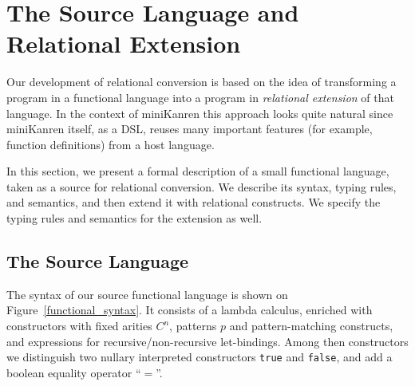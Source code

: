 \section{The Source Language and Relational Extension}

Our development of relational conversion is based on the idea of transforming a program in a functional
language into a program in \emph{relational extension} of that language. In the context of 
miniKanren this approach looks quite natural since miniKanren itself, as a DSL, reuses 
many important features (for example, function definitions) from a host language.

In this section, we present a formal description of a small functional language, taken as a source
for relational conversion. We describe its syntax, typing rules, and semantics, and then extend it
with relational constructs. We specify the typing rules and semantics for the extension as well.


\subsection{The Source Language}
\label{source_language}

The syntax of our source functional language is shown on Figure~\ref{functional_syntax}. It consists of a lambda calculus, 
enriched with constructors with fixed arities $C^n$, patterns $p$ and pattern-matching constructs, and  
expressions for recursive/non-recursive let-bindings.
Among then constructors we distinguish two nullary interpreted constructors \lstinline|true| and \lstinline|false|, and add a boolean equality
operator ``$=$''. 


